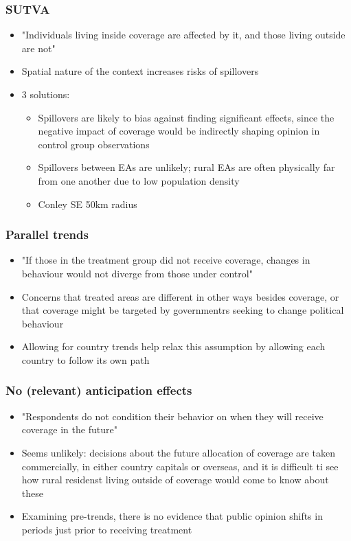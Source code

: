 \documentclass[11pt]{article}
\begin{document}
\subsubsection*{SUTVA}
\begin{itemize}
    \item "Individuals living inside coverage are affected by it, and those living outside are not"
    \item Spatial nature of the context increases risks of spillovers
    \item 3 solutions:
    \begin{itemize}
        \item Spillovers are likely to bias against finding significant effects, since the negative impact of coverage would be indirectly shaping opinion in control group observations
        \item Spillovers between EAs are unlikely; rural EAs are often physically far from one another due to low population density
        \item Conley SE 50km radius
    \end{itemize}
\end{itemize}
\subsubsection*{Parallel trends}
\begin{itemize}
    \item "If those in the treatment group did not receive coverage, changes in behaviour would not diverge from those under control"
    \item Concerns that treated areas are different in other ways besides coverage, or that coverage might be targeted by governmentrs seeking to change political behaviour
    \item Allowing for country trends help relax this assumption by allowing each country to follow its own path
\end{itemize}
\subsubsection*{No (relevant) anticipation effects}
\begin{itemize}
    \item "Respondents do not condition their behavior on when they will receive coverage in the future"
    \item Seems unlikely: decisions about the future allocation of coverage are taken commercially, in either country capitals or overseas, and it is difficult ti see how rural residenst living outside of coverage would come to know about these
    \item Examining pre-trends, there is no evidence that public opinion shifts in periods just prior to receiving treatment
\end{itemize}
\end{document}

